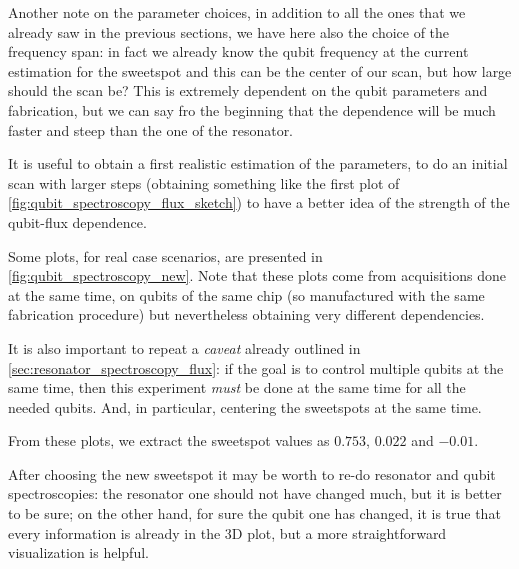 Another note on the parameter choices, in addition to all the ones that we already saw in the previous sections, we have here also the choice of the frequency span: in fact we already know the qubit frequency at the current estimation for the sweetspot and this can be the center of our scan, but how large should the scan be? 
This is extremely dependent on the qubit parameters and fabrication, but  we can say fro the beginning that the dependence will be much faster and steep than the one of the resonator.

It is useful to obtain a first realistic estimation of the parameters, to do an initial scan with larger steps (obtaining something like the first plot of \cref{fig:qubit_spectroscopy_flux_sketch}) to have a better idea of the strength of the qubit-flux dependence.

Some plots, for real case scenarios, are presented in \cref{fig:qubit_spectroscopy_new}.
Note that these plots come from acquisitions done at the same time, on qubits of the same chip (so manufactured with the same fabrication procedure) but nevertheless obtaining very different dependencies.

It is also important to repeat a \textit{caveat} already outlined in \cref{sec:resonator_spectroscopy_flux}: if the goal is to control multiple qubits at the same time, then this experiment \textit{must} be done at the same time for all the needed qubits. And, in particular, centering the sweetspots at the same time.


From these plots, we extract the sweetspot values as $0.753$, $0.022$ and $-0.01$.

After choosing the new sweetspot it may be worth to re-do resonator and qubit spectroscopies: the resonator one should not have changed much, but it is better to be sure; on the other hand, for sure the qubit one has changed, it is true that every information is already in the 3D plot, but a more straightforward visualization is helpful.

